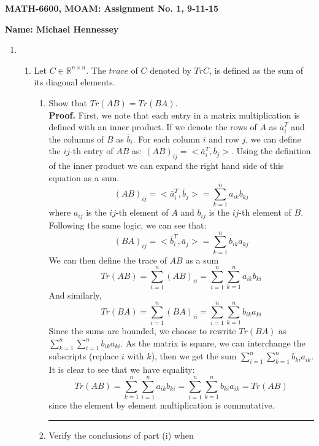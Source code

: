 \documentclass[12pt]{article}
\numberwithin{equation}{section}
\newenvironment{proof}[1][Proof]{\textbf{#1.} }{\ \rule{0.5em}{0.5em}}
\begin{document}
{\large\bf MATH-6600, MOAM: Assignment No. 1, 9-11-15}



\vspace{6 ex}

{\bf Name: Michael Hennessey} \hfill

\vspace{6 ex}

\begin{enumerate}
    \item \begin{enumerate}
        \item Let $C\in\mathbb{R}^{n\times n}$. The $trace$ of $C$ denoted by $TrC$, is defined as the sum of its diagonal elements.
        \begin{enumerate}
            \item Show that $Tr(AB)=Tr(BA)$.\\
                \begin{proof}
                    First, we note that each entry in a matrix multiplication is defined with an inner product. If we denote the rows of $A$ as $\bar{a}^T_i$ and the columns of $B$ as $\bar{b}_i$. For each column $i$ and row $j$, we can define the $ij$-th entry of $AB$ as: $(AB)_{ij}=<\bar{a}_i^T,\bar{b}_j>$. Using the definition of the inner product we can expand the right hand side of this equation as a sum.
                    $$(AB)_{ij}=<\bar{a}_i^T,\bar{b}_j>=\sum_{k=1}^n a_{ik}b_{kj}$$
                    where $a_{ij}$ is the $ij$-th element of $A$ and $b_{ij}$ is the $ij$-th element of $B$. Following the same logic, we can see that:
                    $$(BA)_{ij}=<\bar{b}_i^T,\bar{a}_j>=\sum_{k=1}^n b_{ik}a_{kj}$$
                    We can then define the trace of $AB$ as a sum
                    $$Tr(AB)=\sum_{i=1}^n (AB)_{ii}=\sum_{i=1}^n\sum_{k=1}^n a_{ik}b_{ki}$$
                    And similarly,
                    $$Tr(BA)=\sum_{i=1}^n (BA)_{ii}=\sum_{i=1}^n\sum_{k=1}^n b_{ik}a_{ki}$$
                    Since the sums are bounded, we choose to rewrite $Tr(BA)$ as $\sum_{k=1}^n\sum_{i=1}^n b_{ik}a_{ki}$. As the matrix is square, we can interchange the subscripts (replace $i$ with $k$), then we get the sum $\sum_{i=1}^n\sum_{k=1}^n b_{ki}a_{ik}$. It is clear to see that we have equality:
                    $$Tr(AB)=\sum_{k=1}^n\sum_{i=1}^n a_{ik}b_{ki}= \sum_{i=1}^n\sum_{k=1}^n b_{ki}a_{ik}=Tr(AB)$$
                    since the element by element multiplication is commutative.
                \end{proof}
            \item    Verify the conclusions of part (i) when

\end{enumerate}
\end{enumerate}
\end{enumerate}
\end{document}
